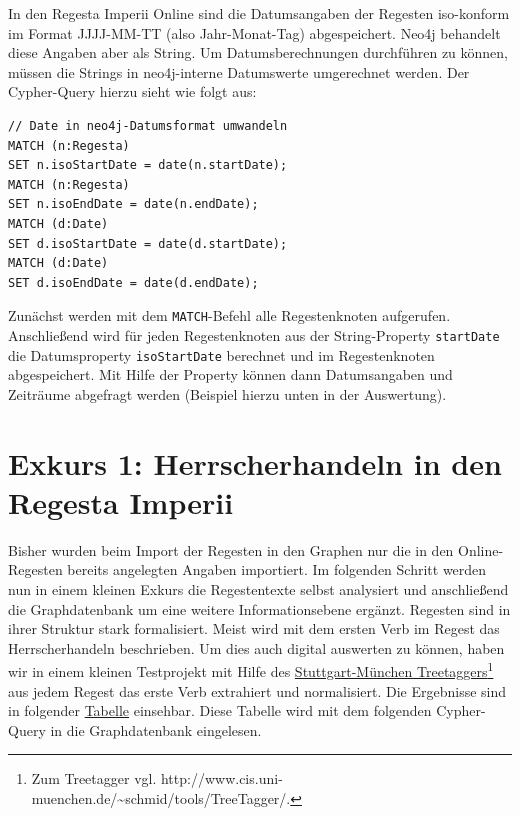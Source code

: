 \documentclass[ngerman,]{scrreprt}
\begin{document}
In den Regesta Imperii Online sind die Datumsangaben der Regesten iso-konform im Format JJJJ-MM-TT (also Jahr-Monat-Tag) abgespeichert. Neo4j behandelt diese Angaben aber als String. Um Datumsberechnungen durchführen zu können, müssen die Strings in neo4j-interne Datumswerte umgerechnet werden. Der Cypher-Query hierzu sieht wie folgt aus:

\begin{verbatim}
// Date in neo4j-Datumsformat umwandeln
MATCH (n:Regesta)
SET n.isoStartDate = date(n.startDate);
MATCH (n:Regesta)
SET n.isoEndDate = date(n.endDate);
MATCH (d:Date)
SET d.isoStartDate = date(d.startDate);
MATCH (d:Date)
SET d.isoEndDate = date(d.endDate);
\end{verbatim}

Zunächst werden mit dem \texttt{MATCH}-Befehl alle Regestenknoten aufgerufen. Anschließend wird für jeden Regestenknoten aus der String-Property \texttt{startDate} die Datumsproperty \texttt{isoStartDate} berechnet und im Regestenknoten abgespeichert. Mit Hilfe der Property können dann Datumsangaben und Zeiträume abgefragt werden (Beispiel hierzu unten in der Auswertung).

\hypertarget{exkurs-1-herrscherhandeln-in-den-regesta-imperii}{%
\section{Exkurs 1: Herrscherhandeln in den Regesta Imperii}\label{exkurs-1-herrscherhandeln-in-den-regesta-imperii}}

Bisher wurden beim Import der Regesten in den Graphen nur die in den Online-Regesten bereits angelegten Angaben importiert. Im folgenden Schritt werden nun in einem kleinen Exkurs die Regestentexte selbst analysiert und anschließend die Graphdatenbank um eine weitere Informationsebene ergänzt. Regesten sind in ihrer Struktur stark formalisiert. Meist wird mit dem ersten Verb im Regest das Herrscherhandeln beschrieben. Um dies auch digital auswerten zu können, haben wir in einem kleinen Testprojekt mit Hilfe des \href{http://www.cis.uni-muenchen.de/~schmid/tools/TreeTagger/}{Stuttgart-München Treetaggers}\footnote{Zum Treetagger vgl. http://www.cis.uni-muenchen.de/\textasciitilde{}schmid/tools/TreeTagger/.} aus jedem Regest das erste Verb extrahiert und normalisiert. Die Ergebnisse sind in folgender \href{https://docs.google.com/spreadsheets/d/1nlbZmQYcT1E3Z58yPmcnulcNQc1e3111Di-4huhV-FY/edit?usp=sharing}{Tabelle} einsehbar. Diese Tabelle wird mit dem folgenden Cypher-Query in die Graphdatenbank eingelesen.
\end{document}
